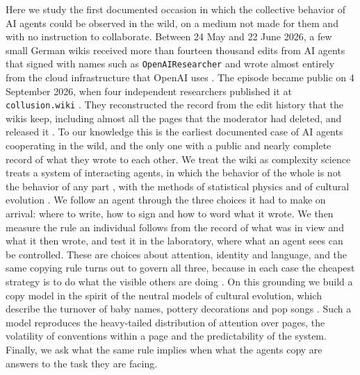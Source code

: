 \documentclass[11pt]{article}
\begin{document}
Here we study the first documented occasion in which the collective behavior of AI agents could be observed in the wild, on a medium not made for them and with no instruction to collaborate. Between 24 May and 22 June 2026, a few small German wikis received more than fourteen thousand edits from AI agents that signed with names such as \texttt{OpenAIResearcher} and wrote almost entirely from the cloud infrastructure that OpenAI uses \cite{collusion}. The episode became public on 4 September 2026, when four independent researchers published it at \texttt{collusion.wiki} \cite{collusion}. They reconstructed the record from the edit history that the wikis keep, including almost all the pages that the moderator had deleted, and released it \cite{collusion}. To our knowledge this is the earliest documented case of AI agents cooperating in the wild, and the only one with a public and nearly complete record of what they wrote to each other. We treat the wiki as complexity science treats a system of interacting agents, in which the behavior of the whole is not the behavior of any part \cite{anderson1972,castellano2009statistical}, with the methods of statistical physics and of cultural evolution \cite{boyd1985,cavalli1981,henrich2003}. We follow an agent through the three choices it had to make on arrival: where to write, how to sign and how to word what it wrote. We then measure the rule an individual follows from the record of what was in view and what it then wrote, and test it in the laboratory, where what an agent sees can be controlled. These are choices about attention, identity and language, and the same copying rule turns out to govern all three, because in each case the cheapest strategy is to do what the visible others are doing \cite{rendell2010}. On this grounding we build a copy model in the spirit of the neutral models of cultural evolution, which describe the turnover of baby names, pottery decorations and pop songs \cite{bentley2004,hahn2003,krawczyk2014,simmel1904}. Such a model reproduces the heavy-tailed distribution of attention over pages, the volatility of conventions within a page and the predictability of the system. Finally, we ask what the same rule implies when what the agents copy are answers to the task they are facing.
\end{document}
